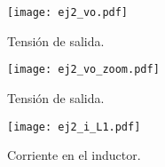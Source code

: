 \begin{figure}[H]
	\centering
	\texttt{[image: ej2\_vo.pdf]}
	\caption{Tensión de salida.}
	\label{fig:ej2_vo}
\end{figure}

\begin{figure}[H]
	\centering
	\texttt{[image: ej2\_vo\_zoom.pdf]}
	\caption{Tensión de salida.}
	\label{fig:ej2_vo_zoom}
\end{figure}

\begin{figure}[H]
	\centering
	\texttt{[image: ej2\_i\_L1.pdf]}
	\caption{Corriente en el inductor.}
	\label{fig:ej2_i_L1}
\end{figure}


